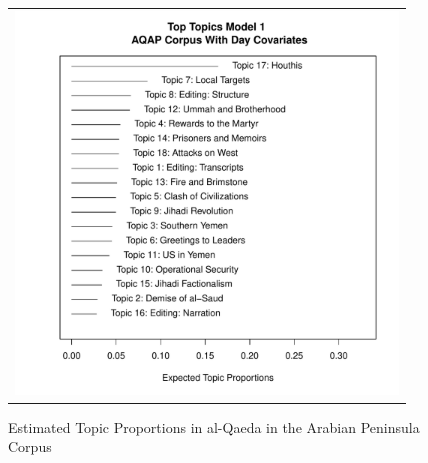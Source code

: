 \begin{figure}
\begin{center}
\begin{tabular}{cc}
  \end{tabular}
\end{center}
  \end{figure}

\begin{figure}
  \begin{center}
  \begin{tabular}{c}
    \includegraphics[width=4.00in]{./Pictures/topicProportions_UT70EDModel.pdf}\\
  \end{tabular}
  \caption{Estimated Topic Proportions in al-Qaeda in the Arabian
    Peninsula Corpus}
  \label{fig:EDModelTopicProportions}
\end{center}
\end{figure}

